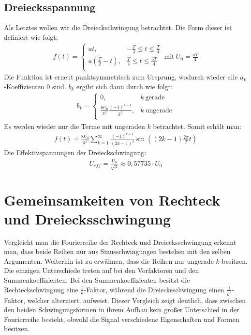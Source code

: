 \subsection*{Dreiecksspannung}
\label{sub:triangle}
Als Letztes wollen wir die Dreieckschwingung betrachtet. Die Form dieser ist definiert wie folgt:
\begin{gather}
    f(t) = 
    \begin{cases}
        at, & -\frac{T}{4} \leq t \leq \frac{T}{4} \\
        a\left(\frac{T}{2}-t\right), & \frac{T}{4} \leq t \leq \frac{3T}{4} \\
    \end{cases}
    ~\text{mit}~U_0 = \frac{aT}{4}
\end{gather} 
Die Funktion ist erneut punktsymmetrisch zum Ursprung, wodurch wieder alle $a_k$-Koeffizienten 0 sind. $b_k$ ergibt sich dann durch wie folgt:
\begin{gather}
    b_k =
    \begin{cases}
        0, & k~\text{gerade}\\
        \frac{8U_0}{\pi^2}\frac{(-1)^{k-1}}{k^2}, & k~\text{ungerade}\\
    \end{cases}
\end{gather}
Es werden wieder nur die Terme mit ungeraden $k$ betrachtet. Somit erhält man:
\begin{gather}
    \boxed{f(t) = \frac{8U_0}{\pi^2} \sum^{\infty}_{k=1} \frac{(-1)^{k-1}}{(2k-1)^2} \sin((2k-1)\frac{2\pi}{T}t)}
\end{gather} 
Die Effektivspannungen der Dreieckschwingung:
\begin{gather}
     \boxed{U_{eff} = \frac{U_0}{\sqrt{3}}\approx 0,57735 \cdot U_0}
\end{gather}
\section*{Gemeinsamkeiten von Rechteck und Dreiecksschwingung}
Vergleicht man die Fourierreihe der Rechteck und Dreiecksschwingung erkennt man, dass beide Reihen nur aus Sinusschwingungen bestehen mit den selben Argumenten. Weiterhin ist zu erwähnen, dass die Reihen nur ungerade $k$ besitzen. Die einzigen Unterschiede treten auf bei den Vorfaktoren und den Summenkoeffizienten. Bei den Summenkoeffizienten besitzt die Rechteckschwingung eine $\frac{1}{k}$-Faktor, während die Dreiecksschwingung einen $\frac{1}{k^2}$-Faktor, welcher alterniert, aufweist. Dieser Vergleich zeigt deutlich, dass zwischen den beiden Schwingungsformen in ihrem Aufbau kein großer Unterschied in der Fourierreihe besteht, obwohl die Signal verschiedene Eigenschaften und Formen besitzen.